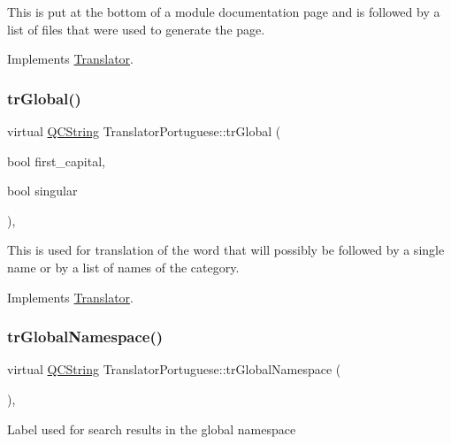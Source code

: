 This is put at the bottom of a module documentation page and is followed by a list of files that were used to generate the page. 

Implements \mbox{\hyperlink{class_translator}{Translator}}.

\mbox{\label{class_translator_portuguese_a7141e5f23b1f3e2e37433cb41b513dcf}} 
\subsubsection{\texorpdfstring{trGlobal()}{trGlobal()}}
{\footnotesize\ttfamily virtual \mbox{\hyperlink{class_q_c_string}{Q\+C\+String}} Translator\+Portuguese\+::tr\+Global (\begin{DoxyParamCaption}\item[{bool}]{first\+\_\+capital,  }\item[{bool}]{singular }\end{DoxyParamCaption})\hspace{0.3cm}{\ttfamily [inline]}, {\ttfamily [virtual]}}

This is used for translation of the word that will possibly be followed by a single name or by a list of names of the category. 

Implements \mbox{\hyperlink{class_translator}{Translator}}.

\mbox{\label{class_translator_portuguese_a28493020b30f93c87c291b6e6d2c3cc1}} 
\subsubsection{\texorpdfstring{trGlobalNamespace()}{trGlobalNamespace()}}
{\footnotesize\ttfamily virtual \mbox{\hyperlink{class_q_c_string}{Q\+C\+String}} Translator\+Portuguese\+::tr\+Global\+Namespace (\begin{DoxyParamCaption}{ }\end{DoxyParamCaption})\hspace{0.3cm}{\ttfamily [inline]}, {\ttfamily [virtual]}}

Label used for search results in the global namespace 

